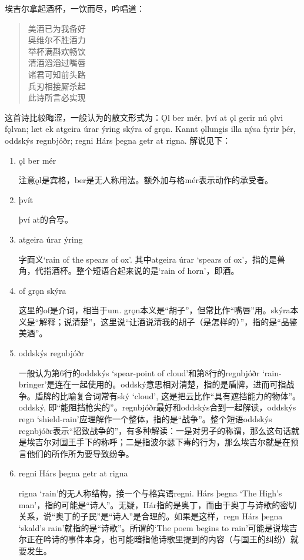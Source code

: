 \begin{translation*}{}
  埃吉尔拿起酒杯，一饮而尽，吟唱道：
  \begin{quote}
    美酒已为我备好\\
    奥维尔不胜酒力\\
    举杯满斟欢畅饮\\
    清酒滔滔过嘴唇\\
    诸君可知前头路\\
    兵刃相接厮杀起\\
    此诗所言必实现
  \end{quote}

\end{translation*}
\begin{grammar*}{}
  这首诗比较晦涩，一般认为的散文形式为：Ǫl ber mér, því at ǫl gerir nú ǫlvi fǫlvan; læt ek atgeira úrar ýring
  skýra of grǫn. Kannt ǫllungis illa nýsa fyrir þér, oddskýs regnbjóðr; regni Hárs þegna getr at rigna. 解说见下：
  \begin{enumerate}[leftmargin=*]
    \item ǫl ber mér

          注意ǫl是宾格，ber是无人称用法。额外加与格mér表示动作的承受者。
    \item þvít

          því at的合写。
    \item atgeira úrar ýring

          字面义`rain of the spears of ox'. 其中atgeira úrar `spears of ox'，指的是兽角，代指酒杯。整个短语合起来说的是`rain of horn'，即酒。

    \item of grǫn skýra

          这里的of是介词，相当于um. grǫn本义是“胡子”，但常比作“嘴唇”用。skýra本义是“解释；说清楚”，这里说“让酒说清我的胡子（是怎样的）”，指的是“品鉴美酒”。

    \item oddskýs regnbjóðr

          一般认为第6行的oddskýs `spear-point of cloud'和第8行的regnbjóðr `rain-bringer'是连在一起使用的。oddský意思相对清楚，指的是盾牌，进而可指战争。盾牌的比喻复合词常有ský `cloud', 这是把云比作“具有遮挡能力的物体”。oddský, 即“能阻挡枪尖的”。regnbjóðr最好和oddskýs合到一起解读，oddskýs regn `shield-rain'应理解作一个整体，指的是“战争”。整个短语oddskýs regnbjóðr表示“招致战争的”，有多种解读：一是对男子的称谓，那么这句话就是埃吉尔对国王手下的称呼；二是指波尔瑟下毒的行为，那么埃吉尔就是在预言他们的所作所为要导致纷争。

    \item regni Hárs þegna getr at rigna

          rigna `rain'的无人称结构，接一个与格宾语regni. Hárs þegna `The High's man'，指的可能是“诗人”。无疑，Hár指的是奥丁，而由于奥丁与诗歌的密切关系，说“奥丁的子民”是“诗人”是合理的。如果是这样，regn Hárs þegna `skald's rain'就指的是“诗歌”。所谓的`The poem begins to rain'可能是说埃吉尔正在吟诗的事件本身，也可能暗指他诗歌里提到的内容（与国王的纠纷）就要发生。

  \end{enumerate}
\end{grammar*}
